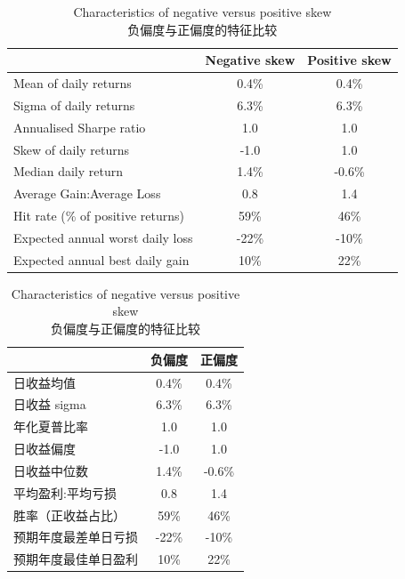 \begin{table}[htbp] \centering \caption{Characteristics of negative versus positive skew\\
负偏度与正偏度的特征比较}\begin{englishtableblock} \begin{tabular}{@{} lcc@{}}
\toprule
& \textbf{Negative skew} & \textbf{Positive skew} \\
\midrule
Mean of daily returns & 0.4\% & 0.4\% \\
Sigma of daily returns & 6.3\% & 6.3\% \\
Annualised Sharpe ratio & 1.0 & 1.0 \\
Skew of daily returns & -1.0 & 1.0 \\
Median daily return & 1.4\% & -0.6\% \\
Average Gain:Average Loss & 0.8 & 1.4 \\
Hit rate (\% of positive returns) & 59\% & 46\% \\
Expected annual worst daily loss & -22\% & -10\% \\
Expected annual best daily gain & 10\% & 22\% \\
\bottomrule
\end{tabular}
\end{englishtableblock}

  \medskip

\begin{chinesetableblock} \begin{tabular}{@{} lcc@{}}
\toprule
& \textbf{负偏度} & \textbf{正偏度} \\
\midrule
日收益均值 & 0.4\% & 0.4\% \\
日收益 sigma & 6.3\% & 6.3\% \\
年化夏普比率 & 1.0 & 1.0 \\
日收益偏度 & -1.0 & 1.0 \\
日收益中位数 & 1.4\% & -0.6\% \\
平均盈利:平均亏损 & 0.8 & 1.4 \\
胜率（正收益占比） & 59\% & 46\% \\
预期年度最差单日亏损 & -22\% & -10\% \\
预期年度最佳单日盈利 & 10\% & 22\% \\
\bottomrule
\end{tabular}
\end{chinesetableblock}
\end{table}

